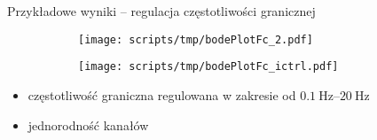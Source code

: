 \begin{frame}{Przykładowe wyniki -- regulacja częstotliwości granicznej}

    \begin{figure}[H]
        \centering
        \begin{subfigure}[b]{0.485\textwidth}
            \centering
            \texttt{[image: scripts/tmp/bodePlotFc\_2.pdf]}  

        \end{subfigure}
        \begin{subfigure}[b]{0.485\textwidth}
            \centering
            \texttt{[image: scripts/tmp/bodePlotFc\_ictrl.pdf]}

        \end{subfigure}     

    \end{figure}
    \vspace{-2em}
    \begin{block}{}
        \begin{itemize}
            \item częstotliwość graniczna regulowana w zakresie od $\SIrange{0.1}{20}{\hertz}$ 
            \item jednorodność kanałów 
        \end{itemize}
    \end{block}


\end{frame}

%  







